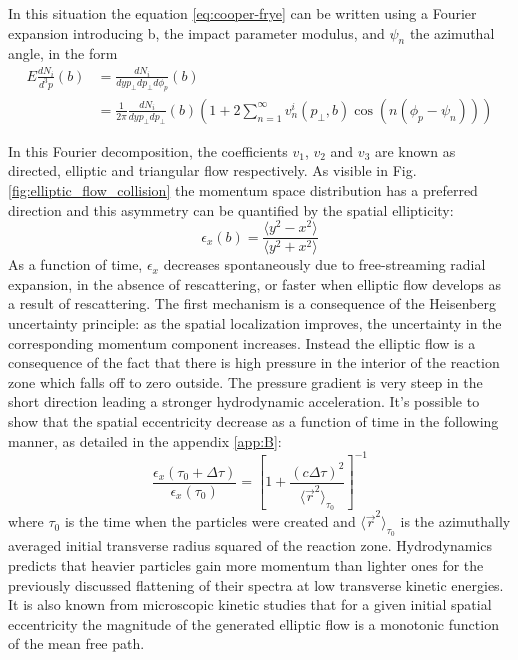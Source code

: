 \documentclass[12pt,a4paper]{book}
\begin{document}
	In this situation the equation \ref{eq:cooper-frye} can be written using a Fourier expansion introducing b, the impact parameter modulus, and $\psi_n$ the azimuthal angle, in the form
	\begin{equation}
		\begin{aligned}
			E \frac{dN_i}{d^3 p}(b) &= \frac{dN_i}{dy p_\perp dp_\perp d\phi_p} (b) \\
			&= \frac{1}{2\pi} \frac{dN_i}{dy p_\perp dp_\perp} (b) \left( 1 + 2 \sum_{n=1}^{\infty} v_n^i(p_\perp,b) \cos(n(\phi_p-\psi_n)) \right)
		\end{aligned}
	\end{equation}
	
	In this Fourier decomposition, the coefficients $v_1$, $v_2$ and $v_3$ are known as directed, elliptic and triangular flow respectively. As visible in Fig. \ref{fig:elliptic_flow_collision} the momentum space distribution has a preferred direction and this asymmetry can be quantified by the spatial ellipticity:
	\begin{equation}
		\epsilon_x(b)=\frac{\langle y^2 - x^2\rangle}{\langle y^2 + x^2\rangle}
		\label{eq:anisotropy}
	\end{equation}
	As a function of time, $\epsilon_x$ decreases spontaneously due to free-streaming radial expansion, in the absence of rescattering, or faster when elliptic flow develops as a result of rescattering. The first mechanism is a consequence of the Heisenberg uncertainty principle: as the spatial localization improves, the uncertainty in the corresponding momentum component increases. Instead the elliptic flow is a consequence of the fact that there is high pressure in the interior of the reaction zone which falls off to zero outside. The pressure gradient is very steep in the short direction leading a stronger hydrodynamic acceleration.  It's possible to show that the spatial eccentricity decrease as a function of time in the following manner, as detailed in the appendix \ref{app:B}:
	\begin{equation}
		\frac{\epsilon_x(\tau_0 + \Delta \tau)}{\epsilon_x(\tau_0)} = \left[1+ \frac{(c \Delta \tau)^2}{\langle \vec{r}^2 \rangle_{\tau_0}} \right]^{-1}
	\end{equation}
	where $\tau_0$ is the time when the particles were created and $\langle \vec{r}^2 \rangle_{\tau_0}$ is the azimuthally averaged initial transverse radius squared of the reaction zone. Hydrodynamics predicts that heavier particles gain more momentum than lighter ones for the previously discussed flattening of their spectra at low transverse kinetic energies. It is also known from microscopic kinetic studies that for a given initial spatial eccentricity the magnitude of the generated elliptic flow is a monotonic function of the mean free path.
	
\end{document}
